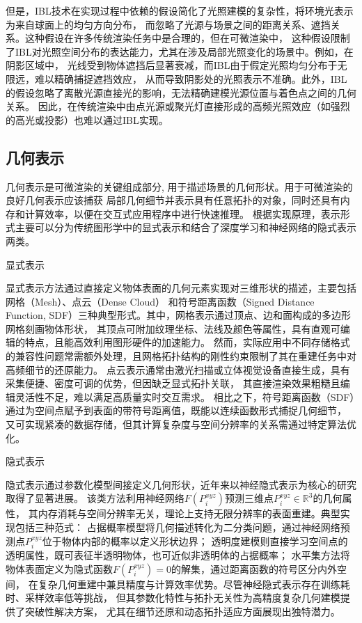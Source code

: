 但是，IBL技术在实现过程中依赖的假设简化了光照建模的复杂性，将环境光表示为来自球面上的均匀方向分布，
而忽略了光源与场景之间的距离关系、遮挡关系。这种假设在许多传统渲染任务中是合理的，但在可微渲染中，
这种假设限制了IBL对光照空间分布的表达能力，尤其在涉及局部光照变化的场景中。例如，在阴影区域中，
光线受到物体遮挡后显著衰减，而IBL由于假定光照均匀分布于无限远，难以精确捕捉遮挡效应，
从而导致阴影处的光照表示不准确。此外，IBL的假设忽略了离散光源直接光的影响，无法精确建模光源位置与着色点之间的几何关系。
因此，在传统渲染中由点光源或聚光灯直接形成的高频光照效应（如强烈的高光或投影）也难以通过IBL实现。

\subsection{几何表示}
几何表示是可微渲染的关键组成部分, 用于描述场景的几何形状。用于可微渲染的良好几何表示应该捕获
局部几何细节并表示具有任意拓扑的对象，同时还具有内存和计算效率，以便在交互式应用程序中进行快速推理。
根据实现原理，表示形式主要可以分为传统图形学中的显式表示和结合了深度学习和神经网络的隐式表示两类。

 显式表示

显式表示方法通过直接定义物体表面的几何元素实现对三维形状的描述，主要包括网格（Mesh）、点云（Dense Cloud）
和符号距离函数（Signed Distance Function, SDF）三种典型形式。其中，网格表示通过顶点、边和面构成的多边形网格刻画物体形状，
其顶点可附加纹理坐标、法线及颜色等属性，具有直观可编辑的特点，且能高效利用图形硬件的加速能力。
然而，实际应用中不同存储格式的兼容性问题常需额外处理，且网格拓扑结构的刚性约束限制了其在重建任务中对高频细节的还原能力。
点云表示通常由激光扫描或立体视觉设备直接生成，具有采集便捷、密度可调的优势，但因缺乏显式拓扑关联，
其直接渲染效果粗糙且编辑灵活性不足，难以满足高质量实时交互需求。
相比之下，符号距离函数（SDF）通过为空间点赋予到表面的带符号距离值，既能以连续函数形式捕捉几何细节，
又可实现紧凑的数据存储，但其计算复杂度与空间分辨率的关系需通过特定算法优化。

 隐式表示

隐式表示通过参数化模型间接定义几何形状，近年来以神经隐式表示为核心的研究取得了显著进展。
该类方法利用神经网络$F(P_i^{xyz})$预测三维点$P_i^{xyz}\in\mathbb{R}^3$的几何属性，
其内存消耗与空间分辨率无关，理论上支持无限分辨率的表面重建。典型实现包括三种范式：
占据概率模型将几何描述转化为二分类问题，通过神经网络预测点$P_i^{xyz}$位于物体内部的概率以定义形状边界；
透明度建模则直接学习空间点的透明属性，既可表征半透明物体，也可近似非透明体的占据概率；
水平集方法将物体表面定义为隐式函数$F(P_i^{xyz})=0$的解集，通过距离函数的符号区分内外空间，
在复杂几何重建中兼具精度与计算效率优势。尽管神经隐式表示存在训练耗时、采样效率低等挑战，
但其参数化特性与拓扑无关性为高精度复杂几何建模提供了突破性解决方案，
尤其在细节还原和动态拓扑适应方面展现出独特潜力。

